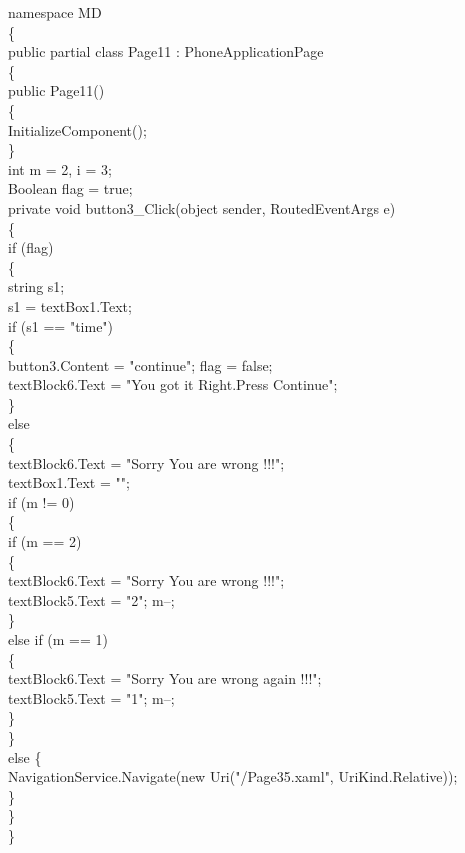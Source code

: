 {{namespace MD\\
\{\\
    public partial class Page11 : PhoneApplicationPage\\
    \{\\
        public Page11()\\
        \{\\
            InitializeComponent();\\
        \}\\
        int m = 2, i = 3;\\
        Boolean flag = true;\\
        private void button3_Click(object sender, RoutedEventArgs e)\\
        \{\\
            if (flag)\\
            \{\\
                string s1;\\
                s1 = textBox1.Text;\\
                if (s1 == "time")\\
                \{\\
                    button3.Content = "continue"; flag = false;\\
                    textBlock6.Text = "You got it Right.Press Continue";\\
                \}\\
                else\\
                \{\\
                    textBlock6.Text = "Sorry You are wrong !!!";\\
                    textBox1.Text = "";\\
                    if (m != 0)\\
                    \{\\

                        if (m == 2)\\
                        \{\\
                            textBlock6.Text = "Sorry You are wrong !!!";\\
                            textBlock5.Text = "2"; m--;\\
                        \}\\
                        else if (m == 1)\\
                        \{\\
                            textBlock6.Text = "Sorry You are wrong again !!!";\\
                            textBlock5.Text = "1"; m--;\\
                        \}\\
                    \}\\
                    else
                    \{\\
                        NavigationService.Navigate(new Uri("/Page35.xaml", UriKind.Relative));\\
                    \}\\
                \}\\
            \}\\

}}
